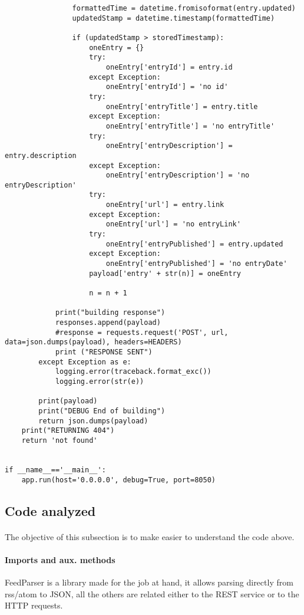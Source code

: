 \documentclass{article}
\begin{document}
\begin{lstlisting}
                formattedTime = datetime.fromisoformat(entry.updated)
                updatedStamp = datetime.timestamp(formattedTime)

                if (updatedStamp > storedTimestamp):
                    oneEntry = {}
                    try:
                        oneEntry['entryId'] = entry.id
                    except Exception:
                        oneEntry['entryId'] = 'no id'
                    try:
                        oneEntry['entryTitle'] = entry.title
                    except Exception:
                        oneEntry['entryTitle'] = 'no entryTitle'
                    try:
                        oneEntry['entryDescription'] = entry.description
                    except Exception:
                        oneEntry['entryDescription'] = 'no entryDescription'
                    try:
                        oneEntry['url'] = entry.link
                    except Exception:
                        oneEntry['url'] = 'no entryLink'
                    try:
                        oneEntry['entryPublished'] = entry.updated
                    except Exception:
                        oneEntry['entryPublished'] = 'no entryDate'
                    payload['entry' + str(n)] = oneEntry

                    n = n + 1

            print("building response")
            responses.append(payload)
            #response = requests.request('POST', url, data=json.dumps(payload), headers=HEADERS)
            print ("RESPONSE SENT")
        except Exception as e:
            logging.error(traceback.format_exc())
            logging.error(str(e))

        print(payload)
        print("DEBUG End of building")
        return json.dumps(payload)
    print("RETURNING 404")
    return 'not found'


if __name__=='__main__':
    app.run(host='0.0.0.0', debug=True, port=8050)
\end{lstlisting}

\subsection{Code analyzed}
\paragraph{}
The objective of this subsection is to make easier to understand the code above.
\paragraph{Imports and aux. methods}
FeedParser is a library made for the job at hand, it allows parsing directly from rss/atom to JSON, all the others are related either to the REST service or to the HTTP requests.
\end{document}
